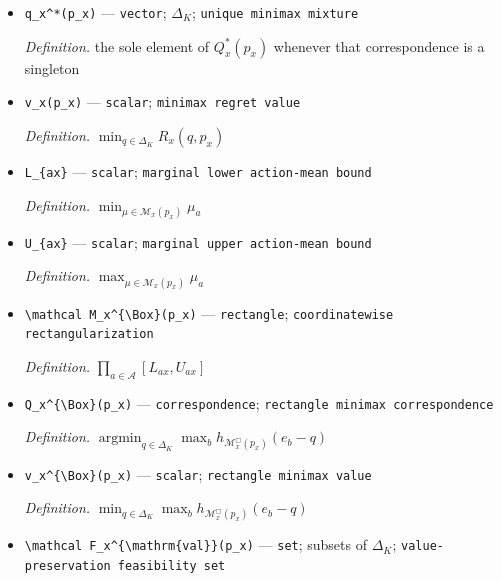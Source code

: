 \documentclass{article}
\begin{document}
\begin{itemize}
  \par\smallskip\noindent\emph{Definition.} \(\prod_{x\in\mathcal X}Q_x^*(p_x)\)
  \item \texttt{q\_\allowbreak{}x\textasciicircum{}*(p\_\allowbreak{}x)} --- \texttt{vector}; \(\Delta_K\); \texttt{unique minimax mixture}
  \par\smallskip\noindent\emph{Definition.} the sole element of \(Q_x^*(p_x)\) whenever that correspondence is a singleton
  \item \texttt{v\_\allowbreak{}x(p\_\allowbreak{}x)} --- \texttt{scalar}; \texttt{minimax regret value}
  \par\smallskip\noindent\emph{Definition.} \(\min_{q\in\Delta_K}R_x(q,p_x)\)
  \item \texttt{L\_\allowbreak{}\{ax\}\allowbreak{}} --- \texttt{scalar}; \texttt{marginal lower action-\allowbreak{}mean bound}
  \par\smallskip\noindent\emph{Definition.} \(\min_{\mu\in\mathcal M_x(p_x)}\mu_a\)
  \item \texttt{U\_\allowbreak{}\{ax\}\allowbreak{}} --- \texttt{scalar}; \texttt{marginal upper action-\allowbreak{}mean bound}
  \par\smallskip\noindent\emph{Definition.} \(\max_{\mu\in\mathcal M_x(p_x)}\mu_a\)
  \item \texttt{\textbackslash{}\allowbreak{}mathcal M\_\allowbreak{}x\textasciicircum{}\{\textbackslash{}\allowbreak{}Box\}\allowbreak{}(p\_\allowbreak{}x)} --- \texttt{rectangle}; \texttt{coordinatewise rectangularization}
  \par\smallskip\noindent\emph{Definition.} \(\prod_{a\in\mathcal A}[L_{ax},U_{ax}]\)
  \item \texttt{Q\_\allowbreak{}x\textasciicircum{}\{\textbackslash{}\allowbreak{}Box\}\allowbreak{}(p\_\allowbreak{}x)} --- \texttt{correspondence}; \texttt{rectangle minimax correspondence}
  \par\smallskip\noindent\emph{Definition.} \(\operatorname*{argmin}_{q\in\Delta_K}\max_b h_{\mathcal M_x^{\Box}(p_x)}(e_b-q)\)
  \item \texttt{v\_\allowbreak{}x\textasciicircum{}\{\textbackslash{}\allowbreak{}Box\}\allowbreak{}(p\_\allowbreak{}x)} --- \texttt{scalar}; \texttt{rectangle minimax value}
  \par\smallskip\noindent\emph{Definition.} \(\min_{q\in\Delta_K}\max_b h_{\mathcal M_x^{\Box}(p_x)}(e_b-q)\)
  \item \texttt{\textbackslash{}\allowbreak{}mathcal F\_\allowbreak{}x\textasciicircum{}\{\textbackslash{}\allowbreak{}mathrm\{val\}\allowbreak{}\}\allowbreak{}(p\_\allowbreak{}x)} --- \texttt{set}; subsets of \(\Delta_K\); \texttt{value-\allowbreak{}preservation feasibility set}

\end{itemize}
\end{document}

